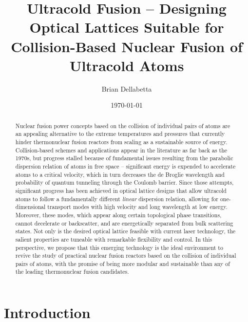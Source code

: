 \documentclass[onecolumn,
               superscriptaddress,
               floatfix,
               longbibliography, 
               showkeys,apl]{revtex4-2}
\begin{document}
\title{Ultracold Fusion -- Designing Optical Lattices Suitable for Collision-Based Nuclear Fusion of Ultracold Atoms}

\author{Brian Dellabetta}


\date{\today}
%
\begin{abstract}
Nuclear fusion power concepts based on the collision of individual pairs of atoms are an appealing alternative to the extreme temperatures and pressures that currently hinder thermonuclear fusion reactors from scaling as a sustainable source of energy. Collision-based schemes and applications appear in the literature as far back as the 1970s, but progress stalled because of fundamental issues resulting from the parabolic dispersion relation of atoms in free space -- significant energy is expended to accelerate atoms to a critical velocity, which in turn decreases the de Broglie wavelength and probability of quantum tunneling through the Coulomb barrier. Since those attempts, significant progress has been achieved in optical lattice designs that allow ultracold atoms to follow a fundamentally different \textit{linear} dispersion relation, allowing for one-dimensional transport modes with high velocity and long wavelength at low energy. Moreover, these modes, which appear along certain topological phase transitions, cannot decelerate or backscatter, and are energetically separated from bulk scattering states. Not only is the desired optical lattice feasible with current laser technology, the salient properties are tuneable with remarkable flexibility and control. In this perspective, we propose that this emerging technology is the ideal environment to revive the study of practical nuclear fusion reactors based on the collision of individual pairs of atoms, with the promise of being more modular and sustainable than any of the leading thermonuclear fusion candidates.


\end{abstract}

\maketitle

\section{Introduction}
\end{document}
